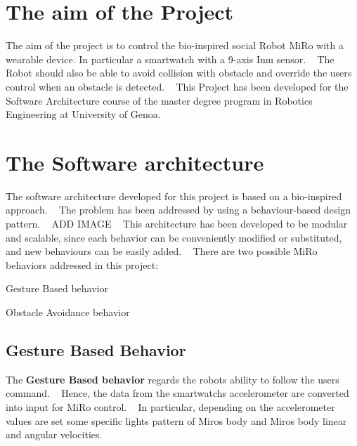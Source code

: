 \hypertarget{index_aim_sec}{}\section{The aim of the Project}\label{index_aim_sec}
The aim of the project is to control the bio-\/inspired social Robot Mi\+Ro with a wearable device. In particular a smartwatch with a 9-\/axis Imu sensor. ~\newline
 The Robot should also be able to avoid collision with obstacle and override the user\textquotesingle{}s control when an obstacle is detected. ~\newline
 This Project has been developed for the Software Architecture course of the master degree program in Robotics Engineering at University of Genoa. \hypertarget{index_sofar_sec}{}\section{The Software architecture}\label{index_sofar_sec}
The software architecture developed for this project is based on a bio-\/inspired approach. ~\newline
 The problem has been addressed by using a behaviour-\/based design pattern. ~\newline
 A\+DD I\+M\+A\+GE ~\newline
 This architecture has been developed to be modular and scalable, since each behavior can be conveniently modified or substituted, and new behaviours can be easily added. ~\newline
 There are two possible Mi\+Ro behaviors addressed in this project\+: 
\begin{DoxyItemize}
\item Gesture Based behavior 
\item Obstacle Avoidance behavior
\end{DoxyItemize}\hypertarget{index_gbb_sec}{}\subsection{Gesture Based Behavior}\label{index_gbb_sec}
The {\bfseries{Gesture Based behavior}} regards the robot\textquotesingle{}s ability to follow the user\textquotesingle{}s command. ~\newline
 Hence, the data from the smartwatch\textquotesingle{}s accelerometer are converted into input for Mi\+Ro control. ~\newline
 In particular, depending on the accelerometer values are set some specific lights pattern of Miro\textquotesingle{}s body and Miro\textquotesingle{}s body linear and angular velocities. ~\newline
